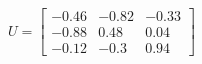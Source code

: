\documentclass[preview]{standalone}
\begin{document}
\begin{align*}
U=\left[\begin{matrix}-0.46&-0.82&-0.33\\-0.88&0.48&0.04\\-0.12&-0.3&0.94\end{matrix}\right]
\end{align*}
\end{document}

